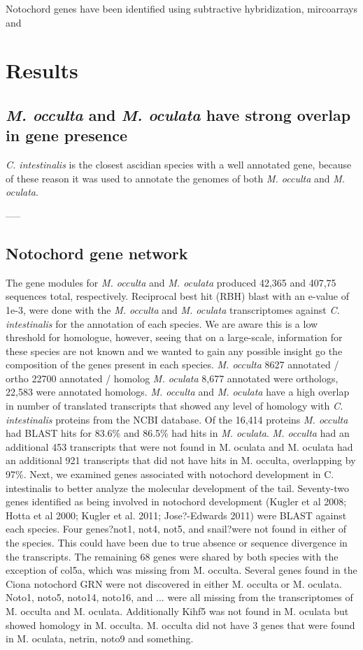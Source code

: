Notochord genes have been identified using subtractive hybridization, mircoarrays and 

\section{Results}
\subsection{\textit{M. occulta} and \textit{M. oculata} have strong overlap in gene presence}
\textit{C. intestinalis} is the closest ascidian species with a well annotated gene, because of these reason it was used to annotate the genomes of both \textit{M. occulta} and \textit{M. oculata}. 

-----
\subsection{Notochord gene network}

The gene modules for \textit{M. occulta} and \textit{M. oculata} produced 42,365 and 407,75 sequences total, respectively. Reciprocal best hit (RBH) blast with an e-value of 1e-3, were done with the \textit{M. occulta} and \textit{M. oculata} transcriptomes against \textit{C. intestinalis} for the annotation of each species.  We are aware this is a low threshold for homologue, however, seeing that on a large-scale, information for these species are not known and we wanted to gain any possible insight go the composition of the genes present in each species. \textit{M. occulta} 8627 annotated / ortho 22700 annotated / homolog \textit{M. oculata} 8,677 annotated were orthologs, 22,583 were annotated homologs. \textit{M. occulta} and \textit{M. oculata} have a high overlap in number of translated transcripts that showed any level of homology with \textit{C. intestinalis} proteins from the NCBI database. Of the 16,414  proteins \textit{M. occulta} had BLAST hits for 83.6\% and 86.5\% had hits in \textit{M. oculata}. \textit{M. occulta} had an additional 453 transcripts that were not found in M. oculata and M. oculata had an additional 921 transcripts that did not have hits in M. occulta, overlapping by 97\%. Next, we examined genes associated with notochord development in C. intestinalis to better analyze the molecular development of the tail.  Seventy-two genes identified as being involved in notochord development (Kugler et al 2008; Hotta et al 2000; Kugler et al. 2011; Jose?-Edwards 2011) were BLAST against each species. Four genes?not1, not4, not5, and snail?were not found in either of the species. This could have been due to true absence or sequence divergence in the transcripts. The remaining 68 genes were shared by both species with the exception of col5a, which was missing from M. occulta. Several genes found in the Ciona notochord GRN were not discovered in either M. occulta or M. oculata. Noto1, noto5, noto14, noto16, and ... were all missing from the transcriptomes of M. occulta and M. oculata. Additionally Kihf5 was not found in M. oculata but showed homology in M. occulta. M. occulta did not have 3 genes that were found in M. oculata, netrin, noto9 and something. 

